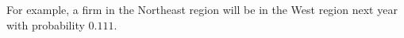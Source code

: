 \begin{exercises}
\begin{center}
    \end{center}
    For example, a firm in the Northeast region will be in the West region
    next year with probability $0.111$.

\end{exercises}
